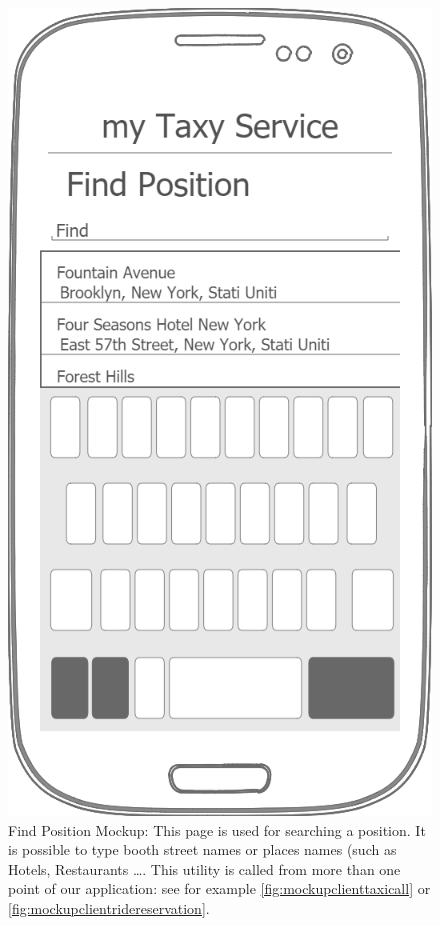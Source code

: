 \documentclass[a4paper]{article}
\begin{document}
\begin{enumerate}[label=\bfseries G\arabic*:]
\begin{figure}[H]
\includegraphics[width=\mockupWidth]{Mockup-ClientsPositionFinder}
\centering
\caption[Find Position Mockup]{Find Position Mockup: \newline This page is used for searching a position. It is possible to type booth street names or places names (such as Hotels, Restaurants \ldots. This utility is called from more than one point of our application: see for example \autoref{fig:mockupclienttaxicall} or  \autoref{fig:mockupclientridereservation}.}
\label{fig:mockupclientfindposition}
\end{figure}


\end{enumerate}
\end{document}
